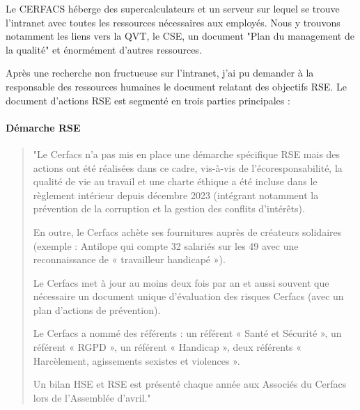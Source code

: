 Le CERFACS héberge des supercalculateurs et un serveur sur lequel se trouve l'intranet avec toutes les ressources nécessaires aux employés.  %
Nous y trouvons notamment les liens vers la \ac{QVT}, le \ac{CSE}, un document "Plan du management de la qualité" et énormément d'autres ressources.




Après une recherche non fructueuse sur l'intranet, j'ai pu demander à la responsable des ressources humaines le document relatant des objectifs \ac{RSE}. Le document d'actions RSE est segmenté en trois parties principales :

\paragraph{Démarche RSE}


\begin{quote}
\setlength{\leftmargin}{0.5cm} %
\setlength{\rightmargin}{0.5cm} %
    "Le Cerfacs n’a pas mis en place une démarche spécifique RSE mais des actions ont été réalisées dans
    ce cadre, vis-à-vis de l’écoresponsabilité, la qualité de vie au travail et une charte éthique a été
    incluse dans le règlement intérieur depuis décembre 2023 (intégrant notamment la prévention de la
    corruption et la gestion des conflits d’intérêts).
    \hspace{0,5cm}

    En outre, le Cerfacs achète ses fournitures auprès de créateurs solidaires (exemple : Antilope qui
    compte 32 salariés sur les 49 avec une reconnaissance de « travailleur handicapé »).
    \hspace{0,5cm}

    Le Cerfacs met à jour au moins deux fois par an et aussi souvent que nécessaire un document unique
    d’évaluation des risques Cerfacs (avec un plan d’actions de prévention).
    \hspace{0,5cm}

    Le Cerfacs a nommé des référents : un référent « Santé et Sécurité », un référent « \ac{RGPD} », un
    référent « Handicap », deux référents « Harcèlement, agissements sexistes et violences ».

    Un bilan HSE et RSE est présenté chaque année aux Associés du Cerfacs lors de l’Assemblée d’avril."
\end{quote}



